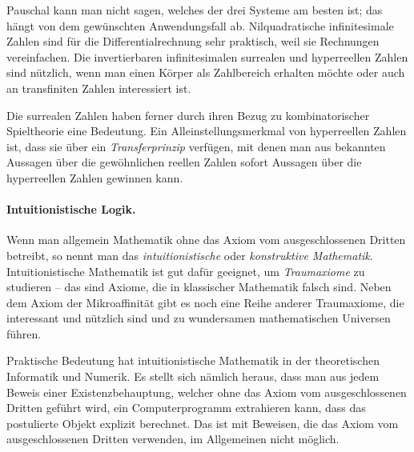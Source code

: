 \documentclass[twoside]{../zirkelblatt}
\theoremstyle{definition}
\theoremstyle{plain}
\theoremstyle{remark}
\begin{document}
Pauschal kann man nicht sagen, welches der drei Systeme am besten ist; das
hängt von dem gewünschten Anwendungsfall ab. Nilquadratische infinitesimale
Zahlen sind für die Differentialrechnung sehr praktisch, weil sie Rechnungen
vereinfachen. Die invertierbaren infinitesimalen surrealen und hyperreellen
Zahlen sind nützlich, wenn man einen Körper als Zahlbereich erhalten möchte
oder auch an transfiniten Zahlen interessiert ist.

Die surrealen Zahlen haben ferner durch ihren Bezug zu kombinatorischer Spieltheorie
eine Bedeutung. Ein Alleinstellungsmerkmal von hyperreellen Zahlen ist, dass
sie über ein \emph{Transferprinzip} verfügen, mit denen man aus bekannten
Aussagen über die gewöhnlichen reellen Zahlen sofort Aussagen über die
hyperreellen Zahlen gewinnen kann.


\paragraph{Intuitionistische Logik.}
Wenn man allgemein Mathematik ohne das Axiom vom ausgeschlossenen
Dritten betreibt, so nennt man das \emph{intuitionistische} oder
\emph{konstruktive Mathematik}. Intuitionistische Mathematik ist gut dafür
geeignet, um \emph{Traumaxiome} zu studieren -- das sind Axiome, die in
klassischer Mathematik falsch sind. Neben dem Axiom der Mikroaffinität gibt es
noch eine Reihe anderer Traumaxiome, die interessant und nützlich sind und
zu wundersamen mathematischen Universen führen.

Praktische Bedeutung hat intuitionistische Mathematik in der theoretischen
Informatik und Numerik. Es stellt sich nämlich heraus, dass man aus jedem
Beweis einer Existenzbehauptung, welcher ohne das Axiom vom ausgeschlossenen
Dritten geführt wird, ein Computerprogramm extrahieren kann, dass das
postulierte Objekt explizit berechnet. Das ist mit Beweisen, die das Axiom vom
ausgeschlossenen Dritten verwenden, im Allgemeinen nicht möglich.
\end{document}
